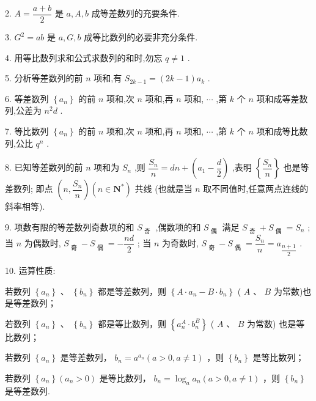 2. $A = \dfrac{a + b}{2}$ 是 $a,A,b$ 成等差数列的充要条件.

3. ${G}^{2} = {ab}$ 是 $a,G,b$ 成等比数列的必要非充分条件.

4. 用等比数列求和公式求数列的和时,勿忘 $q \neq  1$ .

5. 分析等差数列的前 $n$ 项和,有 ${S}_{{2k} - 1} = \left( {{2k} - 1}\right) {a}_{k}$ .

6. 等差数列 $\left\{  {a}_{n}\right\}$ 的前 $n$ 项和,次 $n$ 项和,再 $n$ 项和, $\cdots$ ,第 $k$ 个 $n$ 项和成等差数列,公差为 ${n}^{2}d$ .

7. 等比数列 $\left\{  {a}_{n}\right\}$ 的前 $n$ 项和,次 $n$ 项和,再 $n$ 项和, $\cdots$ ,第 $k$ 个 $n$ 项和成等比数列,公比 ${q}^{n}$ .

8. 已知等差数列的前 $n$ 项和为 ${S}_{n}$ ,则 $\dfrac{{S}_{n}}{n} = {dn} + \left( {{a}_{1} - \dfrac{d}{2}}\right)$ ,表明 $\left\{  \dfrac{{S}_{n}}{n}\right\}$ 也是等差数列; 即点 $\left( {n,\dfrac{{S}_{n}}{n}}\right) \left( {n \in  {\mathbf{N}}^{ * }}\right)$ 共线 (也就是当 $n$ 取不同值时,任意两点连线的斜率相等).

9. 项数有限的等差数列奇数项的和 ${S}_{\text{ 奇 }}$ ,偶数项的和 ${S}_{\text{ 偶 }}$ 满足 ${S}_{\text{ 奇 }} + {S}_{\text{ 偶 }} = {S}_{n}$ ; 当 $n$ 为偶数时, ${S}_{\text{ 奇 }} - {S}_{\text{ 偶 }} =  - \dfrac{nd}{2}$ ; 当 $n$ 为奇数时, ${S}_{\text{ 奇 }} - {S}_{\text{ 偶 }} = \dfrac{{S}_{n}}{n} = {a}_{\dfrac{n + 1}{2}}$ .

10. 运算性质:

   若数列 $\left\{  {a}_{n}\right\}$ 、 $\left\{  {b}_{n}\right\}$ 都是等差数列，则 $\left\{  {A \cdot  {a}_{n} - B \cdot  {b}_{n}}\right\}$ ( $A$ 、 $B$ 为常数)也是等差数列；

  若数列 $\left\{  {a}_{n}\right\}$ 、 $\left\{  {b}_{n}\right\}$ 都是等比数列，则 $\left\{  {{a}_{n}^{A} \cdot  {b}_{n}^{B}}\right\}$ ( $A$ 、 $B$ 为常数) 也是等比数列；

  若数列 $\left\{  {a}_{n}\right\}$ 是等差数列， ${b}_{n} = {a}^{{a}_{n}}\left( {a > 0,a \neq  1}\right)$ ，则 $\left\{  {b}_{n}\right\}$ 是等比数列；

  若数列 $\left\{  {a}_{n}\right\}  \left( {{a}_{n} > 0}\right)$ 是等比数列， ${b}_{n} = {\log }_{a}{a}_{n}\left( {a > 0,a \neq  1}\right)$ ，则 $\left\{  {b}_{n}\right\}$ 是等差数列.


